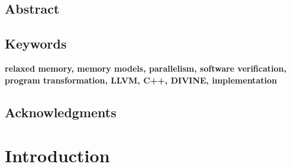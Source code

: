 \documentclass[11pt,twoside,a4paper]{book}
\newcommand{\FI}{Faculty of Informatics}
\newcommand{\MU}{Masaryk University}
\newcommand{\Jirik}{prof. RNDr. Jiří Barnat, Ph.D.}
\newcommand{\thesistitle}{Analysis of Parallel C++ Programs} %
\newcommand{\thesissubtitle}{PHD Thesis}
\newcommand{\thesisauthor}{Vladimír Štill}
\newcommand{\thesisYearCity}{Brno, 2020}
\newcommand{\thesisadvisor}{\Jirik}
\theoremstyle{mydefstyle}
\newcommand{\TODO}[1]{{\bf\color{red}#1}}
\begin{document}
\frontmatter


\pagestyle{fancy}
\cleardoublepage

\section*{Abstract}


\clearpage
\section*{Keywords}
\TODO{relaxed memory, memory models, parallelism, software verification, program transformation,
LLVM, C++, DIVINE, implementation}
\cleardoublepage

\section*{Acknowledgments}

\cleardoublepage

\tableofcontents %

\mainmatter

\chapter{Introduction}\label{chap:introduction}

\end{document}
